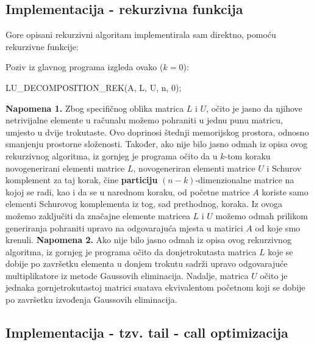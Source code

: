 \documentclass[a4paper,12pt,oneside]{article}
\begin{document}
\subsection*{Implementacija - rekurzivna funkcija}
Gore opisani rekurzivni algoritam implementirala sam direktno, pomoću rekurzivne funkcije:



\noindent Poziv iz glavnog programa izgleda ovako ($k=0$): 
\begin{center}
LU\_DECOMPOSITION\_REK(A, L, U, n, 0);
\end{center}
\noindent\textbf{Napomena 1.} Zbog specifičnog oblika matrica $L$ i $U$, očito je jasno da njihove netrivijalne elemente u računalu možemo pohraniti u jednu punu matricu, umjesto u dvije trokutaste. Ovo doprinosi štednji memorijskog prostora, odnosno smanjenju prostorne složenosti. \newline
\newline\noindent Također, ako nije bilo jasno odmah iz opisa ovog rekurzivnog algoritma, iz gornjeg je programa očito da u $k$-tom koraku novogenerirani elementi matrice $L$, novogeneriran elementi matrice $U$ i Schurov komplement za taj korak, čine \textbf{particiju} $(n-k)$-dimenzionalne matrice na kojoj se radi, kao i da se u narednom koraku, od početne matrice $A$ koriste samo elementi Schurovog komplementa iz tog, sad prethodnog, koraka. Iz ovoga možemo zaključiti da značajne elemente matricea $L$ i $U$ možemo odmah prilikom generiranja pohraniti upravo na odgovarajuća mjesta u matirici $A$ od koje smo krenuli.\newline\newline
\noindent\textbf{Napomena 2.} Ako nije bilo jasno odmah iz opisa ovog rekurzivnog algoritma, iz gornjeg je programa očito da  donjetrokutasta matrica $L$ koje se dobije po završetku elementa u donjem trokutu sadrži upravo odgovarajuće multiplikatore iz metode Gaussovih eliminacija. Nadalje, matrica $U$ očito je jednaka gornjetrokutastoj matrici suatava ekvivalentom početnom koji se dobije po završetku izvođenja Gaussovih eliminacija.

\subsection*{Implementacija - tzv. tail - call optimizacija}


\end{document}
